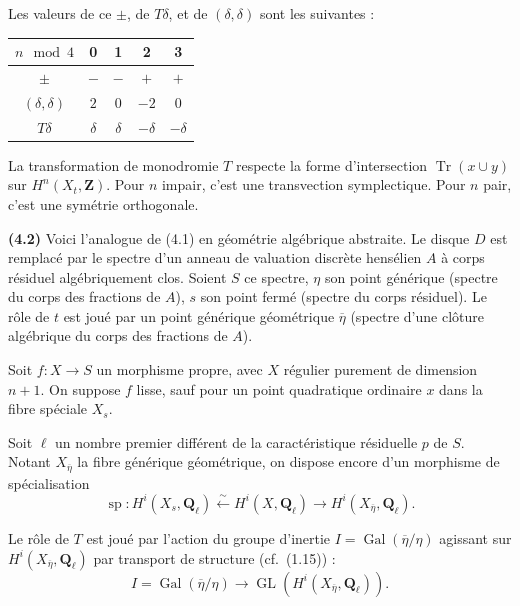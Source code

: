 \documentclass[12pt,a4paper]{amsart}
\theoremstyle{plain}
\theoremstyle{definition}
\theoremstyle{remark}
\DeclareMathOperator{\Tr}{Tr}
\DeclareMathOperator{\Gal}{Gal}
\DeclareMathOperator{\GL}{GL}
\newcommand{\Q}{\mathbf{Q}}
\newcommand{\Z}{\mathbf{Z}}
\numberwithin{equation}{section}
\begin{document}
Les valeurs de ce $\pm$, de $T\delta$, et de $(\delta,\delta)$ sont les suivantes :
\begin{center}
\begin{tabular}{c|cccc}
$n\mod 4$ & 0 & 1 & 2 & 3 \\
\hline
$\pm$ & $-$ & $-$ & $+$ & $+$ \\
$(\delta,\delta)$ & $2$ & $0$ & $-2$ & $0$ \\
$T\delta$ & $\delta$ & $\delta$ & $-\delta$ & $-\delta$
\end{tabular}
\end{center}

La transformation de monodromie $T$ respecte la forme d'intersection $\Tr(x\cup y)$ sur $H^n(X_t,\Z)$. Pour $n$ impair, c'est une transvection symplectique. Pour $n$ pair, c'est une sym\'etrie orthogonale.

\noindent \textbf{(4.2)} Voici l'analogue de (4.1) en g\'eom\'etrie alg\'ebrique abstraite. Le disque $D$ est remplac\'e par le spectre d'un anneau de valuation discr\`ete hens\'elien $A$ \`a corps r\'esiduel alg\'ebriquement clos. Soient $S$ ce spectre, $\eta$ son point g\'en\'erique (spectre du corps des fractions de $A$), $s$ son point ferm\'e (spectre du corps r\'esiduel). Le r\^ole de $t$ est jou\'e par un point g\'en\'erique g\'eom\'etrique $\overline{\eta}$ (spectre d'une cl\^oture alg\'ebrique du corps des fractions de $A$).

Soit $f:X\to S$ un morphisme propre, avec $X$ r\'egulier purement de dimension $n+1$. On suppose $f$ lisse, sauf pour un point quadratique ordinaire $x$ dans la fibre sp\'eciale $X_s$.

Soit $\ell$ un nombre premier diff\'erent de la caract\'eristique r\'esiduelle $p$ de $S$. Notant $X_{\overline{\eta}}$ la fibre g\'en\'erique g\'eom\'etrique, on dispose encore d'un morphisme de sp\'ecialisation
\begin{equation}\label{eq:4.2.1}
\operatorname{sp} : H^i(X_s,\Q_\ell) \xleftarrow{\sim} H^i(X,\Q_\ell) \longrightarrow H^i(X_{\overline{\eta}},\Q_\ell).
\end{equation}

Le r\^ole de $T$ est jou\'e par l'action du groupe d'inertie $I=\Gal(\overline{\eta}/\eta)$ agissant sur $H^i(X_{\overline{\eta}},\Q_\ell)$ par transport de structure (cf.\ (1.15)) :
\begin{equation}\label{eq:4.2.2}
I = \Gal(\overline{\eta}/\eta) \longrightarrow \GL(H^i(X_{\overline{\eta}},\Q_\ell)).
\end{equation}
\end{document}
